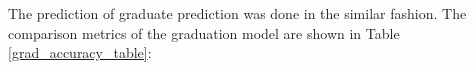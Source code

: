 \documentclass[12pt,english]{report}
\begin{document}

The prediction of graduate prediction was done in the similar fashion. The
comparison metrics of the graduation model are shown in Table
\ref{grad_accuracy_table}:
\end{document}
